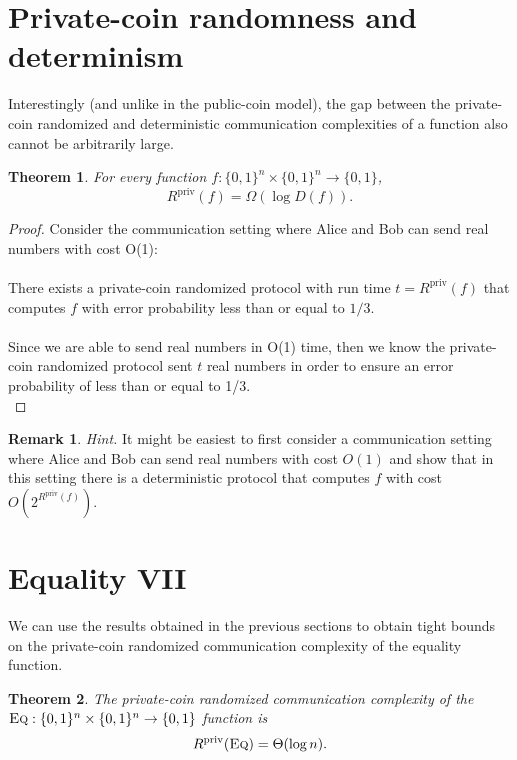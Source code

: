 \documentclass[11pt,oneside]{book}
\theoremstyle{plain}
\newtheorem{theorem}{Theorem}
\theoremstyle{definition}
\newtheorem{remark}{Remark}
\theoremstyle{plain}
\newcommand{\Eq}{\textsc{Eq}}
\newcommand{\Rpriv}{R^{\mathrm{priv}}}
\begin{document}
 
\section{Private-coin randomness and determinism}

Interestingly (and unlike in the public-coin model), the gap between the private-coin randomized and deterministic communication complexities of a function also cannot be arbitrarily large. 

\begin{theorem}
	For every function $f : \{0,1\}^n \times \{0,1\}^n \to \{0,1\}$,
	\[
	\Rpriv(f) = \Omega( \log D(f)).
	\]
\end{theorem}

\begin{proof}
	Consider the communication setting where Alice and Bob can send real numbers with cost O(1):\\
	\\
	There exists a private-coin randomized protocol with run time $t = \Rpriv(f)$ that computes $f$ with error probability less than or equal to $1/3$.\\
	\\
	Since we are able to send real numbers in O(1) time, then we know the private-coin randomized protocol sent $t$ real numbers in order to ensure an error probability of less than or equal to 1/3. \\
	
\end{proof}

\bigskip
\begin{remark}
	\emph{Hint.} It might be easiest to first consider a communication setting where Alice and Bob can send real numbers with cost $O(1)$ and show that in this setting there is a deterministic protocol that computes $f$ with cost $O(2^{\Rpriv(f)})$.
\end{remark}

 
\section{Equality VII}

We can use the results obtained in the previous sections to obtain tight bounds on the private-coin randomized communication complexity of the equality function.

\begin{theorem}
	The private-coin randomized communication complexity of the $\Eq : \{0,1\}^n \times \{0,1\}^n \to \{0,1\}$ function is
	\[
	\Rpriv(\Eq) = \Theta( \log n).
	\]
\end{theorem}
\end{document}
